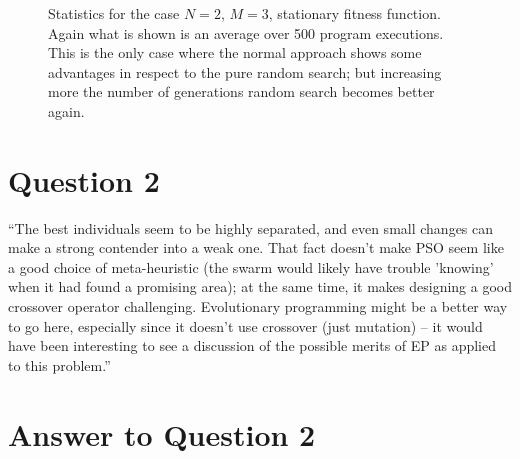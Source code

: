 \documentclass{report}
\begin{document}
\begin{figure}[h]
\centering
{}
\caption[]{Statistics for the case $N=2$, $M=3$, stationary fitness function. Again what is shown is an average over 500 program executions. This is the only case where the normal approach shows some advantages in respect to the pure random search; but increasing more the number of generations random search becomes better again.}
\label{plot23stationary}
\end{figure}

\section*{Question 2}
``The best individuals seem to be highly separated, and even small
    changes can make a strong contender into a weak one. That fact
    doesn't make PSO seem like a good choice of meta-heuristic (the
    swarm would likely have trouble 'knowing' when it had found a
    promising area); at the same time, it makes designing a good
    crossover operator challenging. Evolutionary programming might be a
    better way to go here, especially since it doesn't use crossover
    (just mutation) -- it would have been interesting to see a
    discussion of the possible merits of EP as applied to this problem.''

\section*{Answer to Question 2}
\end{document}
